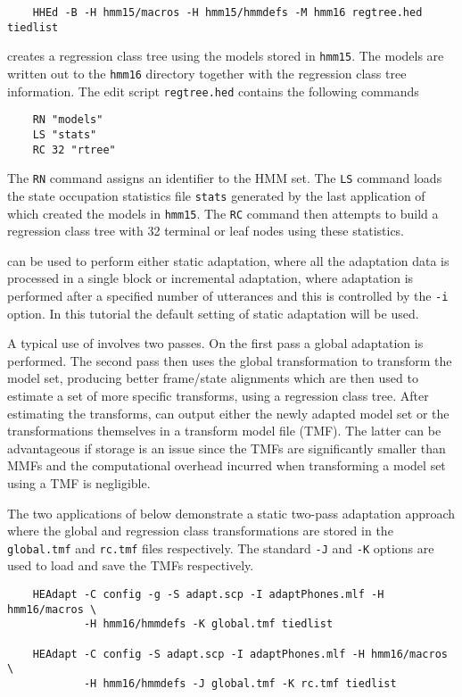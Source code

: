 \begin{verbatim}
    HHEd -B -H hmm15/macros -H hmm15/hmmdefs -M hmm16 regtree.hed tiedlist
\end{verbatim}

\noindent
creates a regression class tree using the models stored in \texttt{hmm15}. 
The models are written out to the \texttt{hmm16} directory together with the 
regression class tree information. The  edit script 
\texttt{regtree.hed} contains the following commands

\begin{verbatim}
    RN "models"
    LS "stats"
    RC 32 "rtree"
\end{verbatim}

\noindent
The \texttt{RN} command assigns an
identifier to the HMM set.
The \texttt{LS} command loads the state 
occupation statistics file 
\texttt{stats} generated by the last application of  which 
created the models in \texttt{hmm15}. 
The \texttt{RC} command then attempts to build 
a regression class tree with 32 terminal or leaf nodes using these statistics.

 can be used to perform either static adaptation, where all the
adaptation data is processed in a single block or incremental
adaptation, where adaptation is performed after a specified number of 
utterances and this is controlled by the \texttt{-i} option. In this tutorial 
the default setting of static adaptation will be used.

A typical use of  involves two passes. On the first pass a 
global adaptation is performed. The second pass then uses the global 
transformation to transform the model set, producing better frame/state 
alignments which are then used to estimate a set of more specific transforms, 
using a regression class tree.
After estimating the transforms,  can output either the newly 
adapted model set or the transformations themselves in a transform model 
file (TMF).
The latter can be advantageous if storage is an issue since the TMFs are 
significantly smaller than MMFs and the computational overhead incurred 
when transforming a model set using a TMF is negligible.
 
The two applications of  below demonstrate a static two-pass 
adaptation approach where the global and regression class transformations are 
stored in the \texttt{global.tmf} and \texttt{rc.tmf} files respectively.
The standard \texttt{-J} and \texttt{-K} options are used to load and save the
TMFs respectively.
\begin{verbatim}
    HEAdapt -C config -g -S adapt.scp -I adaptPhones.mlf -H hmm16/macros \
            -H hmm16/hmmdefs -K global.tmf tiedlist

    HEAdapt -C config -S adapt.scp -I adaptPhones.mlf -H hmm16/macros \ 
            -H hmm16/hmmdefs -J global.tmf -K rc.tmf tiedlist
\end{verbatim}

